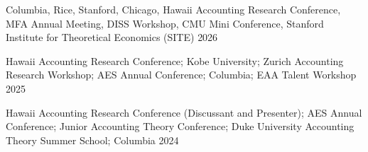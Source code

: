 

\begin{cventries}

\cventrylong
    {Columbia, Rice, Stanford, Chicago,
    Hawaii Accounting Research Conference, MFA Annual Meeting, DISS Workshop,
    CMU Mini Conference, Stanford Institute for Theoretical Economics (SITE)}  %
    {2026} %
    {}

\cventrylong
    {Hawaii Accounting Research Conference; Kobe University; Zurich Accounting Research Workshop; AES Annual Conference; Columbia; EAA Talent Workshop}  %
    {2025} %
    {}
	
\cventrylong
	{Hawaii Accounting Research Conference (Discussant and Presenter); AES Annual Conference; Junior Accounting Theory Conference; Duke University Accounting Theory Summer School; Columbia}  %
    {2024} %
    {}
    
\end{cventries}
